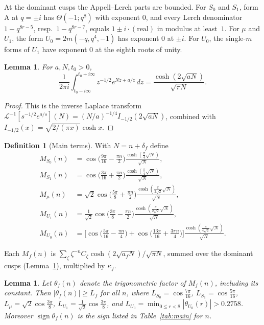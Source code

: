 \documentclass[11pt]{amsart}
\newtheorem{lemma}[theorem]{Lemma}
\theoremstyle{definition}
\newtheorem{definition}[theorem]{Definition}
\theoremstyle{remark}
\numberwithin{equation}{section}
\begin{document}
At the dominant cusps the Appell--Lerch parts are bounded.
For $S_0$ and $S_1$, form A at $q=\pm i$ has $\Theta(-1;q^8)$ with exponent $0$, and every Lerch denominator $1-q^{8r-5}$, resp.\ $1-q^{8r-7}$, equals $1\pm i\cdot(\text{real})$ in modulus at least~$1$.
For $\mu$ and $U_1$, the form $U_0=2m(-q,q^4,-1)$ has exponent $0$ at $\pm i$.
For $U_0$, the single-$m$ forms of $U_1$ have exponent $0$ at the eighth roots of unity.

\begin{lemma}\label{lem:bessel}
For $a,N,t_0>0$,
\[
\frac1{2\pi i}\int_{t_0-i\infty}^{t_0+i\infty}z^{-1/2}e^{Nz+a/z}\,dz=\frac{\cosh(2\sqrt{aN})}{\sqrt{\pi N}}.
\]
\end{lemma}

\begin{proof}
This is the inverse Laplace transform $\mathcal L^{-1}[s^{-1/2}e^{a/s}](N)=(N/a)^{-1/4}I_{-1/2}(2\sqrt{aN})$, combined with $I_{-1/2}(x)=\sqrt{2/(\pi x)}\cosh x$.
\end{proof}

\begin{definition}[Main terms]
With $N=n+\delta_f$ define
\begin{align*}
M_{S_0}(n)&=\cos\Big(\frac{9\pi}{16}-\frac{\pi n}2\Big)\frac{\cosh(\frac\pi4\sqrt N)}{\sqrt N}, \\
M_{S_1}(n)&=\cos\Big(\frac{3\pi}{16}+\frac{\pi n}2\Big)\frac{\cosh(\frac\pi4\sqrt N)}{\sqrt N},\\
M_{\mu}(n)&=\sqrt2\cos\Big(\frac{5\pi}8+\frac{\pi n}2\Big)\frac{\cosh(\frac{\pi}{2\sqrt2}\sqrt N)}{\sqrt N}, \\
M_{U_1}(n)&=\frac1{\sqrt2}\cos\Big(\frac{3\pi}8-\frac{\pi n}2\Big)\frac{\cosh(\frac{\pi}{2\sqrt2}\sqrt N)}{\sqrt N},\\
M_{U_0}(n)&=\Big[\cos\Big(\frac{5\pi}{16}-\frac{\pi n}4\Big)+\cos\Big(\frac{13\pi}{16}+\frac{3\pi n}4\Big)\Big]\frac{\cosh(\frac{\pi}{4\sqrt2}\sqrt N)}{\sqrt N}.
\end{align*}
\end{definition}

Each $M_f(n)$ is $\sum_\zeta\zeta^{-n}C_\zeta\cosh(2\sqrt{a_fN})/\sqrt{\pi N}$, summed over the dominant cusps (Lemma~\ref{lem:bessel}), multiplied by $\kappa_f$.

\begin{lemma}\label{lem:trig}
Let $\theta_f(n)$ denote the trigonometric factor of $M_f(n)$, including its constant.
Then $|\theta_f(n)|\ge L_f$ for all $n$, where $L_{S_0}=\cos\frac{7\pi}{16}$, $L_{S_1}=\cos\frac{5\pi}{16}$, $L_\mu=\sqrt2\cos\frac{3\pi}8$, $L_{U_1}=\frac1{\sqrt2}\cos\frac{3\pi}8$, and $L_{U_0}=\min_{0\le r<8}|\theta_{U_0}(r)|>0.2758$.
Moreover $\operatorname{sign}\theta_f(n)$ is the sign listed in Table~\ref{tab:main} for $n$.
\end{lemma}
\end{document}

